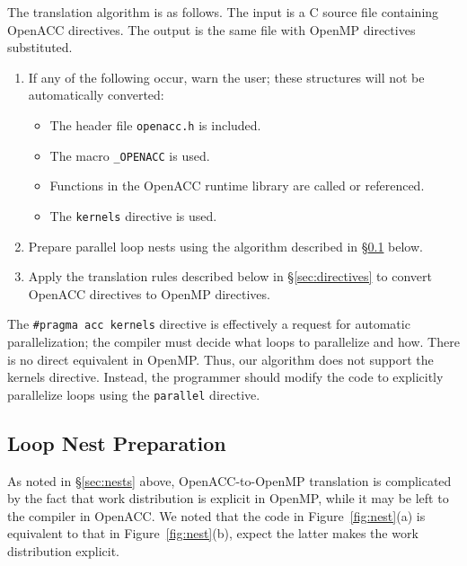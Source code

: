 \documentclass{sig-alternate-05-2015}
\begin{document}
The translation algorithm is as follows.  The input is a C source file
containing OpenACC directives.  The output is the same file with OpenMP
directives substituted.
\begin{enumerate}
\item If any of the following occur, warn the user; these structures will
not be automatically converted:
\begin{itemize}
\item The header file \texttt{openacc.h} is included.
\item The macro \texttt{\_OPENACC} is used.
\item Functions in the OpenACC runtime library are called or referenced.
\item The \texttt{kernels} directive is used.
\end{itemize}
\item Prepare parallel loop nests using the algorithm described in
\S\ref{sec:loops} below.
\item Apply the translation rules described below in \S\ref{sec:directives} to
convert OpenACC directives to OpenMP directives.
\end{enumerate}

The \texttt{\#pragma acc kernels} directive is effectively a request for
automatic parallelization; the compiler must decide what loops to parallelize
and how.  There is no direct equivalent in OpenMP\@.  Thus, our algorithm does
not support the kernels directive.  Instead, the programmer should modify the
code to explicitly parallelize loops using the \texttt{parallel} directive.

\subsection{Loop Nest Preparation}
\label{sec:loops}

As noted in \S\ref{sec:nests} above, OpenACC-to-OpenMP translation is
complicated by the fact that work distribution is explicit in OpenMP, while it
may be left to the compiler in OpenACC\@.  We noted that the code in
Figure~\ref{fig:nest}(a) is equivalent to that in Figure~\ref{fig:nest}(b),
expect the latter makes the work distribution explicit.
\end{document}
